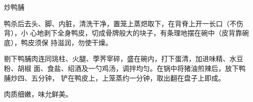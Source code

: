 %
%
%
%
%
%
%
\begin{recipe}{炒鸭脯}

\ingredients


\preparation

鸭杀后去头、脚、内脏，清洗干净，置笼上蒸𤆵取下，在背脊上开一长口（不伤背），小
心地剥下全身鸭皮，切成骨牌般大的块子，有条理地摆在碗中（皮背靠碗底），鸭皮须保
持滋润，勿使干燥。

剔下鸭脯肉连同珧柱、火腿、荸荠宰碎，盛在碗内，打下蛋清，加进味精、水豆粉、胡椒
面、食盐、绍酒及一勺鸡汤，调拌均匀。在锅中将猪油煎辣后，放下鸭脯炒四、五分钟，
铲在鸭皮上，上笼蒸约一分钟，取出翻在盘子上即成。

\features

肉质细嫩，味允鲜美。

\end{recipe}


